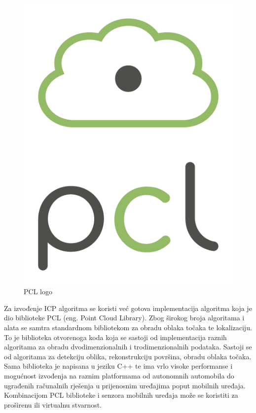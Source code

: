 \begin{figure}[ht!]
  \centering
  \includegraphics[scale=0.2]{images/pcl_logo.png}
  \caption{PCL logo\cite{logo:pcl}}
  \label{fig:pcl_logo}
\end{figure}

Za izvođenje ICP algoritma se koristi već gotova implementacija algoritma koja je dio biblioteke PCL\cite{pcl} (eng. Point Cloud Library). Zbog širokog broja algoritama i alata se samtra standardnom bibliotekom za obradu oblaka točaka te lokalizaciju. To je biblioteka otvorenoga koda koja se sastoji od implementacija raznih algoritama za obradu dvodimenzionalnih i trodimenzionalnih podataka. Sastoji se od algoritama za detekciju oblika, rekonstrukciju površina, obradu oblaka točaka. Sama biblioteka je napisana u jeziku C++ te ima vrlo visoke performanse i mogućnost izvođenja na raznim platformama od autonomnih automobila do ugrađenih računalnih rješenja u prijenosnim uređajima poput mobilnih uređaja. Kombinacijom PCL biblioteke i senzora mobilnih uređaja može se koristiti za proširenu ili virtualnu stvarnost.
\pagebreak
